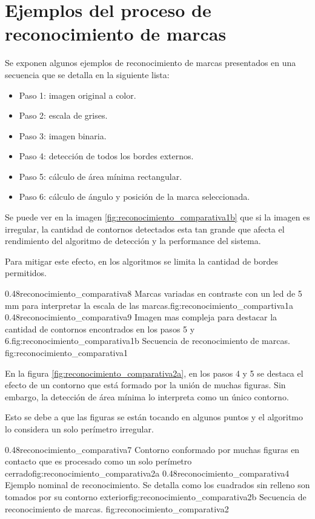 
\chapter{Ejemplos del proceso de reconocimiento de marcas} %
\label{AppendixA} %

         Se exponen algunos ejemplos de reconocimiento de marcas presentados en una secuencia que se detalla en la siguiente lista:
         \begin{itemize}
            \item{Paso 1: imagen original a color.}
            \item{Paso 2: escala de grises.}
            \item{Paso 3: imagen binaria.}
            \item{Paso 4: detección de todos los bordes externos.}
            \item{Paso 5: cálculo de área mínima rectangular.}
            \item{Paso 6: cálculo de ángulo y posición de la marca seleccionada.}
         \end{itemize}

         Se puede ver en la imagen \ref{fig:reconocimiento_comparativa1b} que si la imagen es irregular, la cantidad de contornos detectados esta tan grande que afecta el rendimiento del algoritmo de detección y la performance del sistema. \par
         Para mitigar este efecto, en los algoritmos se limita la cantidad de bordes permitidos.

\subfigab
         {0.48}{reconocimiento_comparativa8} {Marcas variadas en contraste con un led de 5 mm para interpretar la escala de las marcas.}{fig:reconocimiento_compartiva1a}
         {0.48}{reconocimiento_comparativa9} {Imagen mas compleja para destacar la cantidad de contornos encontrados en los pasos 5 y 6.}{fig:reconocimiento_comparativa1b}
         {Secuencia de reconocimiento de marcas.}
         {fig:reconocimiento_comparativa1}

         En la figura \ref{fig:reconocimiento_comparativa2a}, en los pasos 4 y 5 se destaca el efecto de un contorno que está formado por la unión de muchas figuras. Sin embargo, la detección de área mínima lo interpreta como un único contorno.\par Esto se debe a que las figuras se están tocando en algunos puntos y el algoritmo lo considera un solo perímetro irregular.

\subfigab
         {0.48}{reconocimiento_comparativa7} {Contorno conformado por muchas figuras en contacto que es procesado como un solo perímetro cerrado}{fig:reconocimiento_comparativa2a}
         {0.48}{reconocimiento_comparativa4} {Ejemplo nominal de reconocimiento. Se detalla como los cuadrados sin relleno son tomados por su contorno exterior}{fig:reconocimiento_comparativa2b}
         {Secuencia de reconocimiento de marcas.}
         {fig:reconocimiento_comparativa2}



